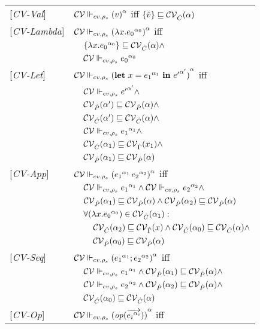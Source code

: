 \begin{table}[htb]
\begin{tabular}{l l l l}
{[\textit{CV-Val}]}&\multicolumn{3}{l}{$ \ccestl {v} $ iff $\{\vat\} \sqsubseteq \Cat(\all)$} \\ 
{[\textit{CV-Lambda}]}&\multicolumn{3}{l}{$ \ccestl {\lam{x}{\lbt 0}} $ iff}\\
&&\multicolumn{2}{l}{$\{\lam{x}{\lbt 0}\} \sqsubseteq \Cat(\all) \wedge $}\\
&&\multicolumn{2}{l}{$ \ccest {\lbt 0}$}\\
{[\textit{CV-Let}]}&\multicolumn{3}{l}{$ \ccestl {\letexpr{x}{\lbt 1}{{e'}^{\all'}}}$ iff}\\
&&\multicolumn{2}{l}{$ \ccest {{e'}^{\all'}} \wedge$} \\
&&\multicolumn{2}{l}{$ \Pat(\all') \sqsubseteq \Pat(\all) \wedge$}\\
&&\multicolumn{2}{l}{$ \Cat(\all') \sqsubseteq \Cat(\all) \wedge$}\\
&&\multicolumn{2}{l}{$\ccest {{e_1}^{\all_1}} \wedge$}\\
&&\multicolumn{2}{l}{ $ \Cat(\all_1) \sqsubseteq \Env(x_1) \wedge$} \\
&&\multicolumn{2}{l}{ $ \Pat(\all_1) \sqsubseteq \Pat(\all) $ }\\
{[\textit{CV-App}]}&\multicolumn{3}{l}{$ \ccestl {\appl {\lbt 1} {\lbt 2}}$ iff}\\
&&\multicolumn{2}{l}{$\ccest {\lbt 1} \wedge \ccest {\lbt 2} \wedge$} \\
&&\multicolumn{2}{l}{$\Pat(\all_1) \sqsubseteq \Pat(\all) \wedge \Pat(\all_2) \sqsubseteq \Pat(\all)$} \\
&&\multicolumn{2}{l}{$\forall (\lam{x}{\lbt 0}) \in \Cat(\all_1) :$}\\
&&&$\Cat(\all_2) \sqsubseteq \Env(x) \wedge \Cat(\all_0) \sqsubseteq \Cat(\all) \wedge$\\
&&&$\Pat(\all_0) \sqsubseteq \Pat(\all) $\\
{[\textit{CV-Seq}]}&\multicolumn{3}{l}{$ \ccestl {\lbt 1;\lbt 2} $ iff } \\ 
&&\multicolumn{2}{l}{$\ccest {\lbt 1} \wedge\Pat(\all_1) \sqsubseteq \Pat(\all) \wedge$} \\
&&\multicolumn{2}{l}{$\ccest {\lbt 2}\wedge \Pat(\all_2) \sqsubseteq \Pat(\all) \wedge$} \\
&&\multicolumn{2}{l}{$\Cat(\all_0) \sqsubseteq \Cat(\all)$} \\
{[\textit{CV-Op}]}&\multicolumn{3}{l}{$ \ccestl {\op (\vec{\lbt i})} $ iff}\\

\end{tabular}
\end{table}
